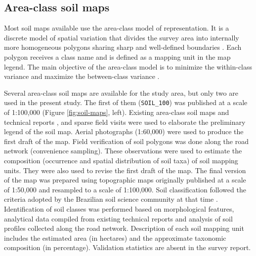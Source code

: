 \tocless\subsection{Area-class soil maps}

Most soil maps available use the area-class model of representation. It is a discrete model of spatial variation that divides the survey area into internally more homogeneous polygons sharing sharp and well-defined boundaries \cite{Rossiter2000}. Each polygon receives a class name and is defined as a mapping unit in the map legend. The main objective of the area-class model is to minimize the within-class variance and maximize the between-class variance \cite{WebsterEtAl1990}.

Several area-class soil maps are available for the study area, but only two are used in the present study. The first of them (\texttt{SOIL\_100}) was published at a scale of 1:100,000 \cite{AzolinEtAl1988} (Figure \ref{fig:soil-maps}, left). Existing area-class soil maps and technical reports \cite{Brasil1973, Azolin1977, MacielEtAl1987a, MacielEtAl1987, AbraoEtAl1988}, and sparse field visits were used to elaborate the preliminary legend of the soil map. Aerial photographs (1:60,000) were used to produce the first draft of the map. Field verification of soil polygons was done along the road network (convenience sampling). These observations were used to estimate the composition (occurrence and spatial distribution of soil taxa) of soil mapping units. They were also used to revise the first draft of the map. The final version of the map was prepared using topographic maps originally published at a scale of 1:50,000 and resampled to a scale of 1:100,000. Soil classification followed the criteria adopted by the Brazilian soil science community at that time \cite{Brasil1973, CamargoEtAl1982, Carvalho1982, LemosEtAl1982, OlmosEtAl1982}. Identification of soil classes was performed based on morphological features, analytical data compiled from existing technical reports and analysis of soil profiles collected along the road network. Description of each soil mapping unit includes the estimated area (in hectares) and the approximate taxonomic composition (in percentage). Validation statistics are absent in the survey report.

